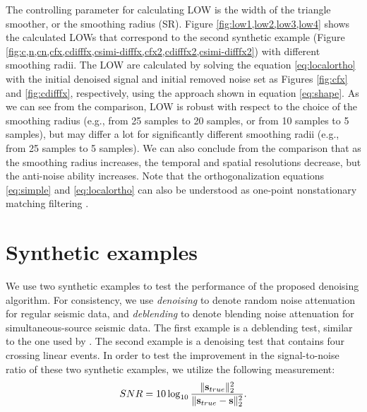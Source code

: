 The controlling parameter for calculating LOW is the width of the triangle smoother, or the smoothing radius (SR). Figure \ref{fig:low1,low2,low3,low4} shows the calculated LOWs that correspond to the second synthetic example (Figure \ref{fig:c,n,cn,cfx,cdifffx,csimi-difffx,cfx2,cdifffx2,csimi-difffx2}) with different smoothing radii. The LOW are calculated by solving the equation \ref{eq:localortho} with the initial denoised signal and initial removed noise set as Figures \ref{fig:cfx} and \ref{fig:cdifffx}, respectively, using the approach shown in equation \ref{eq:shape}. As we can see from the comparison, LOW is robust with respect to the choice of the smoothing radius (e.g., from 25 samples to 20 samples, or from 10 samples to 5 samples), but may differ a lot for significantly different smoothing radii (e.g., from 25 samples to 5 samples). We can also conclude from the comparison that as the smoothing radius increases, the temporal and spatial resolutions decrease, but the anti-noise ability increases. %
Note that the orthogonalization equations \ref{eq:simple} and \ref{eq:localortho} can also be understood as one-point nonstationary matching filtering \cite[]{fomel20095}.

\section{Synthetic examples}
We use two synthetic examples to test the performance of the proposed denoising algorithm. For consistency, we use \emph{denoising} to denote random noise attenuation for regular seismic data, and \emph{deblending} to denote blending noise attenuation for simultaneous-source seismic data. The first example is a deblending test, similar to the one used by \cite{mediandeblend}. The second example is a denoising test that contains four crossing linear events. In order to test the improvement in the signal-to-noise ratio of these two synthetic examples, we utilize the following measurement:
\begin{equation}
\label{eq:diff}
SNR=10\log_{10}\frac{\Arrowvert \mathbf{s}_{true} \Arrowvert_2^2}{\Arrowvert \mathbf{s}_{true} -\mathbf{s}\Arrowvert_2^2}.
\end{equation}



